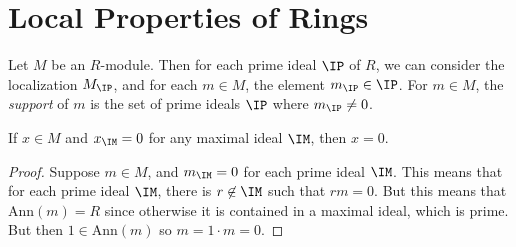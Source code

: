 
\section{Local Properties of Rings}

Let $M$ be an $R$-module. Then for each prime ideal $\IP$ of $R$, we can consider the localization $M_{\IP}$, and for each $m \in M$, the element $m_{\IP} \in \IP$. For $m \in M$, the \emph{support} of $m$ is the set of prime ideals $\IP$ where $m_{\IP} \neq 0$.

\begin{lemma}
    If $x \in M$ and $x_{\IM} = 0$ for any maximal ideal $\IM$, then $x = 0$.
\end{lemma}
\begin{proof}
    Suppose $m \in M$, and $m_{\IM} = 0$ for each prime ideal $\IM$. This means that for each prime ideal $\IM$, there is $r \not \in \IM$ such that $rm = 0$. But this means that $\text{Ann}(m) = R$ since otherwise it is contained in a maximal ideal, which is prime. But then $1 \in \text{Ann}(m)$ so $m = 1 \cdot m = 0$.
\end{proof}

